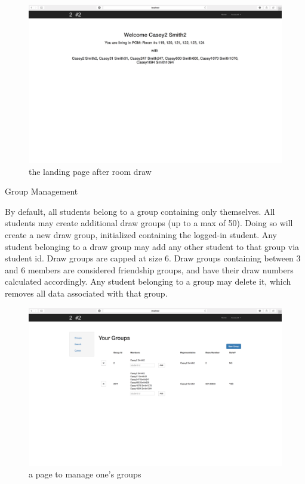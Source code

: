 \begin{outline}
\begin{figure}[H] \centering
\includegraphics[scale=.225]{screens/landing_drawn}
\caption{the landing page after room draw}
\label{fig:screenlandingdrawn}
\end{figure}
    
\1 Group Management

  \2 By default, all students belong to a group containing only themselves.
  \2 All students may create additional draw groups (up to a max of 50). Doing
  so will create a new draw group, initialized containing the logged-in student.
  \2 Any student belonging to a draw group may add any other student to that
  group via student id. Draw groups are capped at size 6. Draw groups containing
  between 3 and 6 members are considered friendship groups, and have their draw
  numbers calculated accordingly.
  \2 Any student belonging to a group may delete it, which removes all data
  associated with that group.

\begin{figure}[H] \centering
\includegraphics[scale=.225]{screens/group}
\caption{a page to manage one's groups}
\label{fig:screengroup}
\end{figure}
  

\end{outline}
